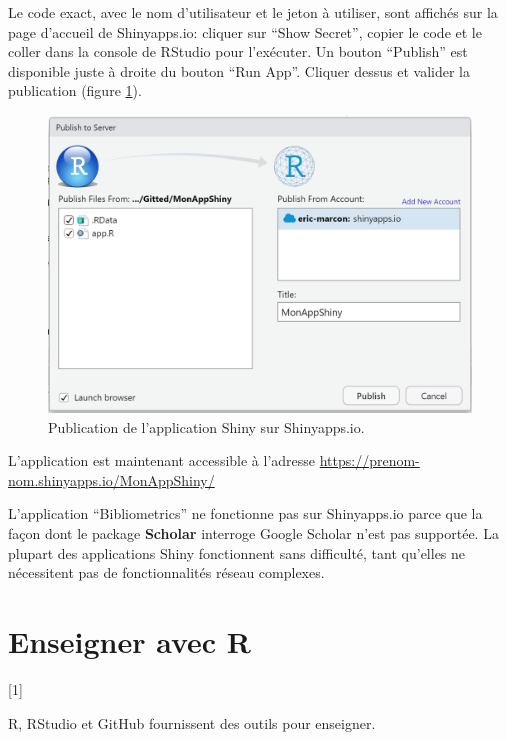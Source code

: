 \documentclass[
  12pt,
  french,
  a4paper,
  extrafontsizes,onecolumn,openright
  ]{memoir}
\newcommand{\toc}[1]{%
  \startcontents[chapters]%
  \printcontents[chapters]{}{1}[#1]{}%
  ~\newline%
}
\begin{document}
\normalsize

Le code exact, avec le nom d'utilisateur et le jeton à utiliser, sont affichés sur la page d'accueil de Shinyapps.io: cliquer sur \enquote{Show Secret}, copier le code et le coller dans la console de RStudio pour l'exécuter.
Un bouton \enquote{Publish} est disponible juste à droite du bouton \enquote{Run App}.
Cliquer dessus et valider la publication (figure \ref{fig:shiny-publish}).



\scriptsize

\begin{figure}

{\centering \includegraphics[width=0.8\linewidth]{images/shiny-publish} 

}

\caption{Publication de l'application Shiny sur Shinyapps.io.}\label{fig:shiny-publish}
\end{figure}

\normalsize

L'application est maintenant accessible à l'adresse \url{https://prenom-nom.shinyapps.io/MonAppShiny/}

L'application \enquote{Bibliometrics} ne fonctionne pas sur Shinyapps.io parce que la façon dont le package \textbf{Scholar} interroge Google Scholar n'est pas supportée.
La plupart des applications Shiny fonctionnent sans difficulté, tant qu'elles ne nécessitent pas de fonctionnalités réseau complexes.

\chapter{Enseigner avec R}\label{chap-enseigner}

\toc{1}

R, RStudio et GitHub fournissent des outils pour enseigner.
\end{document}
